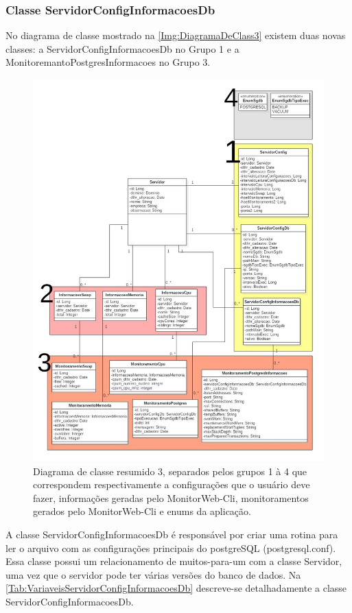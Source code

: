 \subsubsection{Classe ServidorConfigInformacoesDb}

No diagrama de classe mostrado na \autoref{Img:DiagramaDeClass3} existem duas novas classes: a ServidorConfigInformacoesDb no Grupo 1 e a MonitoremantoPostgresInformacoes no Grupo 3.

\begin{figure}[H]
	\centering
	\includegraphics[width=1.0\textwidth]{figuras/DiagramaDeClass3.jpg}
	\caption[Diagrama de classe resumido 3.]{Diagrama de classe resumido 3, separados pelos grupos 1 à 4 que correspondem respectivamente a configurações que o usuário deve fazer, informações geradas pelo MonitorWeb-Cli, monitoramentos gerados pelo MonitorWeb-Cli e enums da aplicação.}
	\label{Img:DiagramaDeClass3}
\end{figure}

 A classe ServidorConfigInformacoesDb é responsável por criar uma rotina para ler o arquivo com as configurações principais do postgreSQL (postgresql.conf). Essa classe possui um relacionamento de muitos-para-um com a classe Servidor, uma vez que o servidor pode ter várias versões do banco de dados. Na \autoref{Tab:VariaveisServidorConfigInformacoesDb} descreve-se detalhadamente a classe ServidorConfigInformacoesDb.

